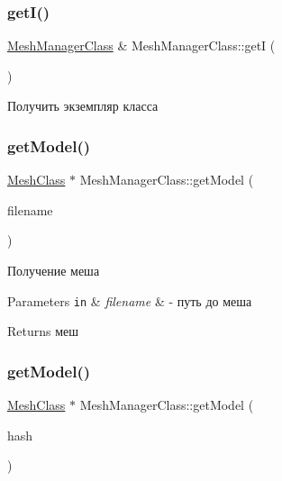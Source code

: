 \subsubsection{\texorpdfstring{get\+I()}{getI()}}
{\footnotesize\ttfamily \hyperlink{class_mesh_manager_class}{Mesh\+Manager\+Class} \& Mesh\+Manager\+Class\+::getI (\begin{DoxyParamCaption}{ }\end{DoxyParamCaption})\hspace{0.3cm}{\ttfamily [static]}}



Получить экземпляр класса 

\mbox{\label{class_mesh_manager_class_a9f2a568cafeeafb602f02e00fda4ec23}} 
\subsubsection{\texorpdfstring{get\+Model()}{getModel()}\hspace{0.1cm}{\footnotesize\ttfamily [1/2]}}
{\footnotesize\ttfamily \hyperlink{class_mesh_class}{Mesh\+Class} $\ast$ Mesh\+Manager\+Class\+::get\+Model (\begin{DoxyParamCaption}\item[{\hyperlink{class_path_class}{Path\+Class} $\ast$}]{filename }\end{DoxyParamCaption})}



Получение меша 


\begin{DoxyParams}[1]{Parameters}
\mbox{\tt in}  & {\em filename} & -\/ путь до меша \\
\hline
\end{DoxyParams}
\begin{DoxyReturn}{Returns}
меш 
\end{DoxyReturn}
\mbox{\label{class_mesh_manager_class_aa257d9db0f3f16419edac815624fa4c5}} 
\subsubsection{\texorpdfstring{get\+Model()}{getModel()}\hspace{0.1cm}{\footnotesize\ttfamily [2/2]}}
{\footnotesize\ttfamily \hyperlink{class_mesh_class}{Mesh\+Class} $\ast$ Mesh\+Manager\+Class\+::get\+Model (\begin{DoxyParamCaption}\item[{int}]{hash }\end{DoxyParamCaption})}



